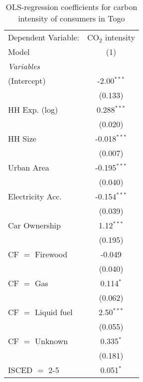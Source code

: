 
\begin{table}[htbp!]
   \centering
   \small
   \begin{adjustbox}{width = 1\textwidth, max height = 0.95\textheight, center}
      \begin{threeparttable}[b]
         \caption{\label{tab:OLS_1_TGO} OLS-regression coefficients for carbon intensity of consumers in Togo}
         \begin{tabular}{lc}
            \tabularnewline \midrule \midrule
            Dependent Variable: & CO$_{2}$ intensity\\  
            Model               & (1)\\  
            \midrule
            \emph{Variables}\\
            (Intercept)         & -2.00$^{***}$\\   
                                & (0.133)\\   
            HH Exp. (log)       & 0.288$^{***}$\\   
                                & (0.020)\\   
            HH Size             & -0.018$^{***}$\\   
                                & (0.007)\\   
            Urban Area          & -0.195$^{***}$\\   
                                & (0.040)\\   
            Electricity Acc.    & -0.154$^{***}$\\   
                                & (0.039)\\   
            Car Ownership       & 1.12$^{***}$\\   
                                & (0.195)\\   
            CF $=$ Firewood     & -0.049\\   
                                & (0.040)\\   
            CF $=$ Gas          & 0.114$^{*}$\\   
                                & (0.062)\\   
            CF $=$ Liquid fuel  & 2.50$^{***}$\\   
                                & (0.055)\\   
            CF $=$ Unknown      & 0.335$^{*}$\\   
                                & (0.181)\\   
            ISCED $=$ 2-5       & 0.051$^{*}$\\   

\end{tabular}
\end{threeparttable}
\end{adjustbox}
\end{table}
